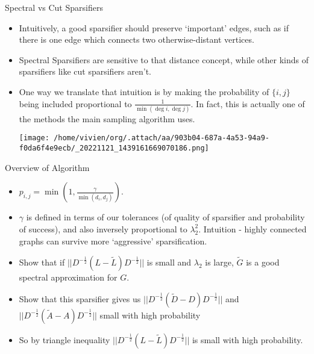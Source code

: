 \documentclass[presentation]{beamer}
\begin{document}
\begin{frame}[label={sec:org6f4c4bc}]{Spectral vs Cut Sparsifiers}
\begin{itemize}
\item Intuitively, a good sparsifier should preserve `important' edges, such as if there is one edge which connects two otherwise-distant vertices.

\item Spectral Sparsifiers are sensitive to that distance concept, while other kinds of sparsifiers like cut sparsifiers aren't.

\item One way we translate that intuition is by making the probability of \(\{i,j\}\) being included proportional to  \(\frac{1}{\min(\deg i, \deg j)}\). In fact, this is actually one of the methods the main sampling algorithm uses.

\begin{center}
\texttt{[image: /home/vivien/org/.attach/aa/903b04-687a-4a53-94a9-f0da6f4e9ecb/\_20221121\_1439161669070186.png]}
\end{center}
\end{itemize}
\end{frame}
\begin{frame}[label={sec:org14665ea}]{Overview of Algorithm}
\begin{itemize}
\item \(p_{i,j}=\min(1,\frac{\gamma}{\min(d_i,d_j)})\).
\item \(\gamma\) is defined in terms of our tolerances (of quality of sparsifier and probability of success), and also inversely proportional to \(\lambda_2^2\). Intuition - highly connected graphs can survive more `aggressive' sparsification.
\item Show that if \(||D^{-\frac12}(L-\tilde{L}) D^{-\frac12}||\) is small and \(\lambda_2\) is large, \(\tilde{G}\) is a good spectral approximation for \(G\).
\item Show that this sparsifier gives us \(||D^{-\frac12}(\tilde{D}-D)D^{-\frac12}||\) and \(||D^{-\frac12}(\tilde{A}-A)D^{-\frac12}||\) small with high probability
\item So by triangle inequality \(||D^{-\frac12}(L-\tilde{L}) D^{-\frac12}||\) is small with high probability.
\end{itemize}
\end{frame}
\end{document}
